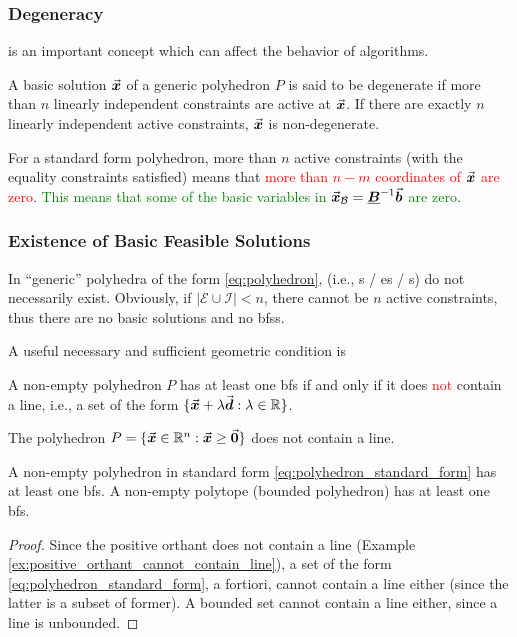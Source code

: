 \subsubsection{Degeneracy}\label{sec:degeneracy_linear_programming}
is an important concept which can affect the behavior of algorithms.

\begin{definition}\label{def:degeneracy}
A basic solution \(\vec{\boldsymbol{x}}\) of a generic polyhedron \(P\) is said to be degenerate if more than \(n\) linearly independent constraints are active at \(\vec{\boldsymbol{x}}\).
If there are exactly \(n\) linearly independent active constraints, \(\vec{\boldsymbol{x}}\) is non-degenerate.
\end{definition}

For a standard form polyhedron, more than \(n\) active constraints (with the equality constraints satisfied) means that \textcolor{red}{more than \(n - m\) coordinates of \(\vec{\boldsymbol{x}}\) are zero}.
\textcolor{green}{This means that some of the basic variables in \(\vec{\boldsymbol{x}}_\mathcal{B} = \underline{\boldsymbol{B}}^{-1} \vec{\boldsymbol{b}}\) are zero}.

\subsubsection{Existence of Basic Feasible Solutions}\label{sec:existence_basic_feasible_solutions}
In ``generic'' polyhedra of the form \eqref{eq:polyhedron},  (i.e., s / es / s) do not necessarily exist.
Obviously, if \(|\mathcal{E} \cup \mathcal{I}| < n\), there cannot be \(n\) active constraints, thus there are no basic solutions and no \gls{bfs}s.

A useful necessary and sufficient geometric condition is
\begin{theorem}\label{thm:existence_basic_feasible_solutions}
A non-empty polyhedron \(P\) has at least one \gls{bfs} if and only if it does \textcolor{red}{not} contain a line, i.e., a set of the form \(\{\vec{\boldsymbol{x}} + \lambda \vec{\boldsymbol{d}} : \lambda \in \mathbb{R}\}\).%
\end{theorem}
\begin{example}\label{ex:positive_orthant_cannot_contain_line}
The polyhedron \(P = \{\vec{\boldsymbol{x}} \in \mathbb{R}^{n} : \vec{\boldsymbol{x}} \geq \vec{\boldsymbol{0}}\}\) does not contain a line.
\end{example}
\begin{corollary}\label{cor:existence_basic_feasible_solutions}
A non-empty polyhedron in standard form \eqref{eq:polyhedron_standard_form} has at least one \gls{bfs}.
A non-empty polytope (bounded polyhedron) has at least one \gls{bfs}.
\end{corollary}
\begin{proof}
Since the positive orthant does not contain a line (Example \ref{ex:positive_orthant_cannot_contain_line}), a set of the form \eqref{eq:polyhedron_standard_form}, a fortiori, cannot contain a line either (since the latter is a subset of former).
A bounded set cannot contain a line either, since a line is unbounded.
\end{proof}

